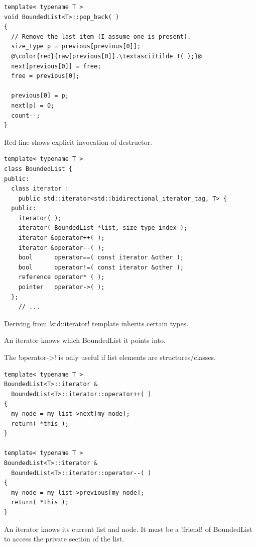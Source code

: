 \documentclass[landscape]{slides}
\begin{document}

{\small
\begin{lstlisting}[escapechar=@]
template< typename T >
void BoundedList<T>::pop_back( )
{
  // Remove the last item (I assume one is present).
  size_type p = previous[previous[0]];
  @\color{red}{raw[previous[0]].\textasciitilde T( );}@
  next[previous[0]] = free;
  free = previous[0];

  previous[0] = p;
  next[p] = 0;
  count--;
}
\end{lstlisting}
}
Red line shows explicit invocation of destructor.
\stopslide


{\small
\begin{lstlisting}
template< typename T >
class BoundedList {
public:
  class iterator :
    public std::iterator<std::bidirectional_iterator_tag, T> {
  public:
    iterator( );
    iterator( BoundedList *list, size_type index );
    iterator &operator++( );
    iterator &operator--( );
    bool      operator==( const iterator &other );
    bool      operator!=( const iterator &other );
    reference operator* ( );
    pointer   operator->( );
  };
    // ...
\end{lstlisting}
}
\begin{citemize}
\item Deriving from !std::iterator! template inherits certain types.
\item An iterator knows which BoundedList it points into.
\item The !operator->! is only useful if list elements are structures/classes.
\end{citemize}
\stopslide


{\small
\begin{lstlisting}
template< typename T >
BoundedList<T>::iterator &
  BoundedList<T>::iterator::operator++( )
{
  my_node = my_list->next[my_node];
  return( *this );
}

template< typename T >
BoundedList<T>::iterator &
  BoundedList<T>::iterator::operator--( )
{
  my_node = my_list->previous[my_node];
  return( *this );
}
\end{lstlisting}
}
An iterator knows its current list and node. It must be a !friend! of BoundedList to access the
private section of the list.
\stopslide

\end{document}
